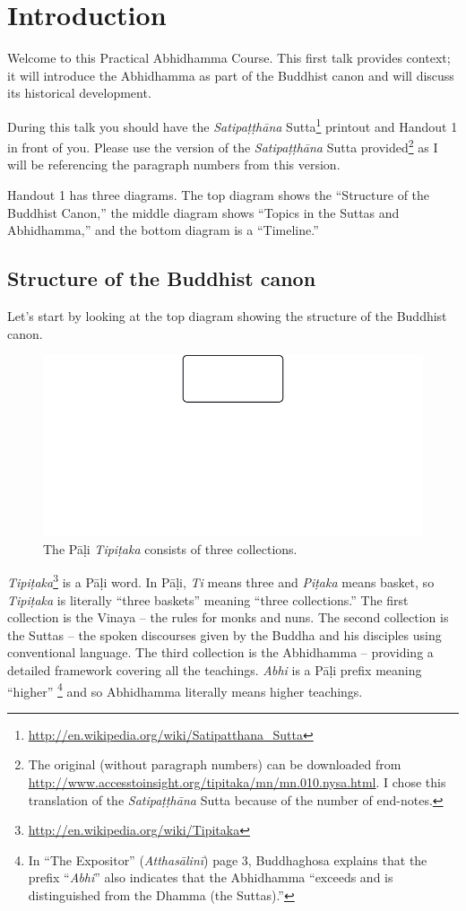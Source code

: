 \section{Introduction}

Welcome to this Practical Abhidhamma Course. This first talk provides context; it will introduce the Abhidhamma as part of the Buddhist canon and will discuss its historical development.

During this talk you should have the \textit{Satipaṭṭhāna} Sutta\footnote{\url{http://en.wikipedia.org/wiki/Satipatthana_Sutta}} printout and Handout 1 in front of you. Please use the version of the \textit{Satipaṭṭhāna} Sutta provided\footnote{The original (without paragraph numbers) can be downloaded from \url{http://www.accesstoinsight.org/tipitaka/mn/mn.010.nysa.html}. I chose this translation of the \textit{Satipaṭṭhāna} Sutta because of the number of end-notes.} as I will be referencing the paragraph numbers from this version.

Handout 1 has three diagrams. The top diagram shows the “Structure of the Buddhist Canon,” the middle diagram shows “Topics in the Suttas and Abhidhamma,” and the bottom diagram is a “Timeline.”

\subsection*{Structure of the Buddhist canon}

Let’s start by looking at the top diagram showing the structure of the Buddhist canon.

\begin{figure}[H]
\centering
\includegraphics[width=0.6\linewidth]{./Diagrams/Tipitaka}
\caption{The Pāḷi \textit{Tipiṭaka} consists of three collections.}
\label{fig:Tipitaka}
\end{figure}

\textit{Tipiṭaka}\footnote{\url{http://en.wikipedia.org/wiki/Tipitaka}} is a Pāḷi word. In Pāḷi, \textit{Ti} means three and \textit{Piṭaka} means basket, so \textit{Tipiṭaka} is literally “three baskets” meaning “three collections.” The first collection is the Vinaya – the rules for monks and nuns. The second collection is the Suttas – the spoken discourses given by the Buddha and his disciples using conventional language. The third collection is the Abhidhamma – providing a detailed framework covering all the teachings. \textit{Abhi} is a Pāḷi prefix meaning “higher” \footnote{In “The Expositor” (\textit{Atthasālinī}) page 3, Buddhaghosa explains that the prefix “\textit{Abhi}” also indicates that the Abhidhamma “exceeds and is distinguished from the Dhamma (the Suttas).”} and so Abhidhamma literally means higher teachings.

